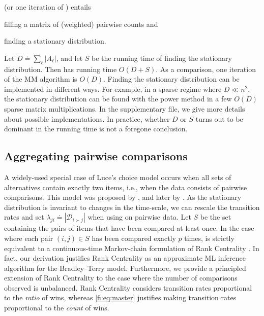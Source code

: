 \LSR{} (or one iteration of \ILSR{}) entails 
\begin{enuminline}
\item filling a matrix of (weighted) pairwise counts and
\item finding a stationary distribution.
\end{enuminline}
Let $D \doteq \sum_{\ell} |A_\ell|$, and let $S$ be the running time of finding the stationary distribution.
Then \LSR{} has running time $O(D + S)$.
As a comparison, one iteration of the MM algorithm \citep{hunter2004mm} is $O(D)$.
Finding the stationary distribution can be implemented in different ways.
For example, in a sparse regime where $D \ll n^2$, the stationary distribution can be found with the power method in a few $O(D)$ sparse matrix multiplications.
In the supplementary file, we give more details about possible implementations.
In practice, whether $D$ or $S$ turns out to be dominant in the running time is not a foregone conclusion.

\subsection{Aggregating pairwise comparisons}
\label{fi:sec:pairwise}

A widely-used special case of Luce's choice model occurs when all sets of alternatives contain exactly two items, i.e., when the data consists of pairwise comparisons.
This model was proposed by \citet{zermelo1928berechnung}, and later by \citet{bradley1952rank}.
As the stationary distribution is invariant to changes in the time-scale, we can rescale the transition rates and set $\lambda_{ji} \doteq |\mathcal{D}_{i \succ j}|$ when using \LSR{} on pairwise data.
Let $S$ be the set containing the pairs of items that have been compared at least once.
In the case where each pair $(i, j) \in S$ has been compared exactly $p$ times, \LSR{} is strictly equivalent to a continuous-time Markov-chain formulation of Rank Centrality \citep{negahban2012iterative}.
In fact, our derivation justifies Rank Centrality as an approximate ML inference algorithm for the Bradley--Terry model.
Furthermore, we provide a principled extension of Rank Centrality to the case where the number of comparisons observed is unbalanced.
Rank Centrality considers transition rates proportional to the \emph{ratio} of wins, whereas \eqref{fi:eq:master} justifies making transition rates proportional to the \emph{count} of wins.

